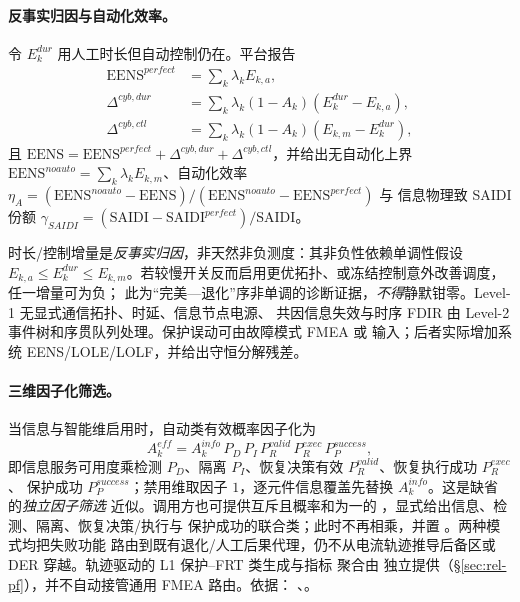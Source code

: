 \paragraph{反事实归因与自动化效率。}
令 $E_k^{dur}$ 用人工时长但自动控制仍在。平台报告
\begin{align}
 \mathrm{EENS}^{perfect}&=\sum_k\lambda_kE_{k,a},\\
 \Delta^{cyb,dur}&=\sum_k\lambda_k(1-A_k)(E_k^{dur}-E_{k,a}),\\
 \Delta^{cyb,ctl}&=\sum_k\lambda_k(1-A_k)(E_{k,m}-E_k^{dur}),
\end{align}
且 $\mathrm{EENS}=\mathrm{EENS}^{perfect}+\Delta^{cyb,dur}+\Delta^{cyb,ctl}$，并给出无自动化上界
$\mathrm{EENS}^{noauto}=\sum_k\lambda_kE_{k,m}$、自动化效率
$\eta_A=(\mathrm{EENS}^{noauto}-\mathrm{EENS})/(\mathrm{EENS}^{noauto}-\mathrm{EENS}^{perfect})$ 与
信息物理致 SAIDI 份额 $\gamma_{SAIDI}=(\mathrm{SAIDI}-\mathrm{SAIDI}^{perfect})/\mathrm{SAIDI}$。
\begin{boundarynote}
时长/控制增量是\emph{反事实归因}，非天然非负测度：其非负性依赖单调性假设
$E_{k,a}\le E_k^{dur}\le E_{k,m}$。若较慢开关反而启用更优拓扑、或冻结控制意外改善调度，任一增量可为负；
此为“完美—退化”序非单调的诊断证据，\emph{不得}静默钳零。Level-1 无显式通信拓扑、时延、信息节点电源、
共因信息失效与时序 FDIR 由 Level-2 事件树和序贯队列处理。保护误动可由故障模式 FMEA 或
 输入；后者实际增加系统 EENS/LOLE/LOLF，并给出守恒分解残差。
\end{boundarynote}

\paragraph{三维因子化筛选。}
当信息与智能维启用时，自动类有效概率因子化为
\begin{equation}
 A_k^{eff}=A_k^{info}\,P_D\,P_I\,P_R^{valid}\,P_R^{exec}\,P_P^{success},
 \label{eq:rel-fa-factor}
\end{equation}
即信息服务可用度乘检测 $P_D$、隔离 $P_I$、恢复决策有效 $P_R^{valid}$、恢复执行成功 $P_R^{exec}$、
保护成功 $P_P^{success}$；禁用维取因子 $1$，逐元件信息覆盖先替换 $A_k^{info}$。这是缺省的\emph{独立因子筛选}
近似。调用方也可提供互斥且概率和为一的 ，显式给出信息、检测、隔离、恢复决策/执行与
保护成功的联合类；此时不再相乘，并置 。两种模式均把失败功能
路由到既有退化/人工后果代理，仍不从电流轨迹推导后备区或 DER 穿越。轨迹驱动的 L1 保护--FRT 类生成与指标
聚合由  独立提供（\S\ref{sec:rel-pf}），并不自动接管通用 FMEA 路由。依据：
、。

